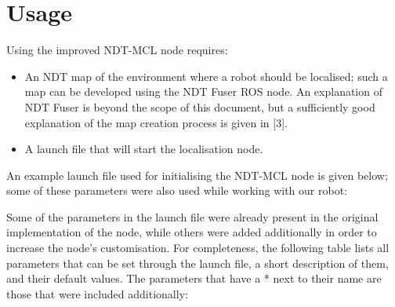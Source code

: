 \documentclass[12pt]{article}
\begin{document}
	\section{Usage}
	\label{sec:usage}

	Using the improved NDT-MCL node requires:
	\begin{itemize}
		\item An NDT map of the environment where a robot should be localised; such a map can be developed using the NDT Fuser ROS node. An explanation of NDT Fuser is beyond the scope of this document, but a sufficiently good explanation of the map creation process is given in [3].
		\item A launch file that will start the localisation node.
	\end{itemize}
	An example launch file used for initialising the NDT-MCL node is given below; some of these parameters were also used while working with our robot:
	
	Some of the parameters in the launch file were already present in the original implementation of the node, while others were added additionally in order to increase the node's customisation. For completeness, the following table lists all parameters that can be set through the launch file, a short description of them, and their default values. The parameters that have a * next to their name are those that were included additionally:
\end{document}

